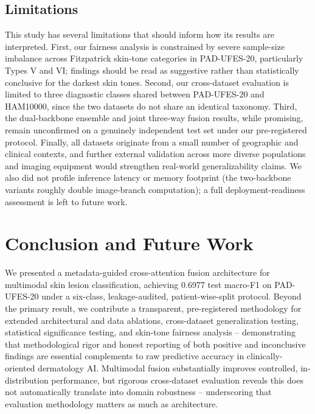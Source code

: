 \documentclass[conference]{IEEEtran}
\begin{document}
\subsection{Limitations}
This study has several limitations that should inform how its results are interpreted. First, our fairness analysis is constrained by severe sample-size imbalance across Fitzpatrick skin-tone categories in PAD-UFES-20, particularly Types V and VI; findings should be read as suggestive rather than statistically conclusive for the darkest skin tones. Second, our cross-dataset evaluation is limited to three diagnostic classes shared between PAD-UFES-20 and HAM10000, since the two datasets do not share an identical taxonomy. Third, the dual-backbone ensemble and joint three-way fusion results, while promising, remain unconfirmed on a genuinely independent test set under our pre-registered protocol. Finally, all datasets originate from a small number of geographic and clinical contexts, and further external validation across more diverse populations and imaging equipment would strengthen real-world generalizability claims. We also did not profile inference latency or memory footprint (the two-backbone variants roughly double image-branch computation); a full deployment-readiness assessment is left to future work.

\section{Conclusion and Future Work}
We presented a metadata-guided cross-attention fusion architecture for multimodal skin lesion classification, achieving 0.6977 test macro-F1 on PAD-UFES-20 under a six-class, leakage-audited, patient-wise-split protocol. Beyond the primary result, we contribute a transparent, pre-registered methodology for extended architectural and data ablations, cross-dataset generalization testing, statistical significance testing, and skin-tone fairness analysis -- demonstrating that methodological rigor and honest reporting of both positive and inconclusive findings are essential complements to raw predictive accuracy in clinically-oriented dermatology AI. Multimodal fusion substantially improves controlled, in-distribution performance, but rigorous cross-dataset evaluation reveals this does not automatically translate into domain robustness -- underscoring that evaluation methodology matters as much as architecture.
\end{document}
